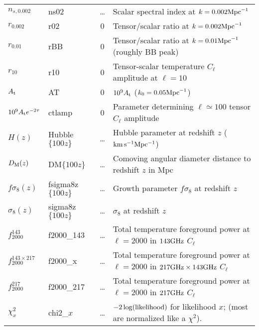 \begin{tabular} {| l | l | c | l |}
\hline
$n_{s,0.002}$&  ns02    &\dots &Scalar spectral index at $k=0.002{\rm Mpc}^{-1}$\\
$r_{0.002}  $&  r02    & 0 & Tensor/scalar ratio at $k=0.002{\rm Mpc}^{-1}$\\
$r_{0.01}   $&  rBB    & 0 & Tensor/scalar ratio at $k=0.01{\rm Mpc}^{-1}$ (roughly BB peak)\\
$r_{10  }   $&  r10    & 0 & Tensor-scalar temperature $C_\ell$ amplitude at $\ell=10$\\
$A_{\rm t}  $&  AT    & 0 & $10^9 A_{\rm t}$ ($k_0 = 0.05{\rm Mpc}^{-1}$)\\
$10^9 A_{\rm t} e^{-2\tau} $ &  ctlamp & 0 & Parameter determining $\ell\simeq 100$ tensor $C_\ell$ amplitude \\
\hline
$ H(z)            $ &  Hubble$\{100z\}$  &\dots & Hubble parameter at redshift $z$ ($\rm km\, s^{-1} Mpc^{-1}$)\\
$ D_{\rm M}(z)    $ &  DM$\{100z\}$  &\dots & Comoving angular diameter distance to redshift $z$ in {\rm Mpc}\\
$ f\sigma_8(z)                 $ &  fsigma8z$\{100z\}$    &\dots &Growth parameter $f\sigma_8$ at redshift $z$\\
$ \sigma_8(z)               $ &  sigma8z$\{100z\}$    &\dots & $\sigma_8$ at redshift $z$\\
\hline
$ f^{143}_{2000}     $ &  f2000\_143    &\dots & Total temperature foreground power at $\ell=2000$ in $143{\rm GHz}$ $C_\ell$\\
$ f^{143\times 217}_{2000}     $ &  f2000\_x    &\dots & Total temperature foreground power at $\ell=2000$ in $217{\rm GHz}\times 143{\rm GHz}$ $C_\ell$\\
$ f^{217}_{2000}     $ &  f2000\_217    &\dots & Total temperature foreground power at $\ell=2000$ in $217{\rm GHz}$ $C_\ell$\\
\hline
$ \chi^2_{x}              $ &  chi2\_$x$  &\dots & $-2\log({\rm likelihood})$ for likelihood $x$; (most are normalized like a $\chi^2$).\\
\hline
\end{tabular}

\newpage

